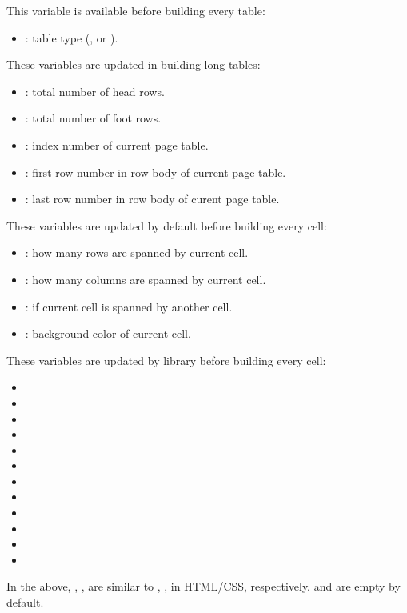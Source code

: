 \documentclass[oneside]{book}
\begin{document}
{This variable is available before building every table:
\begin{itemize}[nosep]
  \item \CC{\lTblrPortraitTypeTl}: table type (,  or ).
\end{itemize}

These variables are updated in building long tables:
\begin{itemize}[nosep]
  \item \CC{\lTblrRowHeadInt}: total number of head rows.
  \item \CC{\lTblrRowFootInt}: total number of foot rows.
  \item \CC{\lTblrTablePageInt}: index number of current page table.
  \item \CC{\lTblrRowFirstInt}: first row number in row body of current page table.
  \item \CC{\lTblrRowLastInt}: last row number in row body of curent page table.
\end{itemize}

These variables are updated by default before building every cell:
\begin{itemize}[nosep]
  \item \CC{\lTblrCellRowSpanInt}: how many rows are spanned by current cell.
  \item \CC{\lTblrCellColSpanInt}: how many columns are spanned by current cell.
  \item \CC{\lTblrCellOmittedBool}: if current cell is spanned by another cell.
  \item \CC{\lTblrCellBackgroundTl}: background color of current cell.
\end{itemize}

These variables are updated by  library before building every cell:
\begin{itemize}[nosep]
  \item \CC{\lTblrCellAboveBorderStyleTl}
  \item \CC{\lTblrCellAboveBorderWidthDim}
  \item \CC{\lTblrCellAboveBorderColorTl}
  \item \CC{\lTblrCellBelowBorderStyleTl}
  \item \CC{\lTblrCellBelowBorderWidthDim}
  \item \CC{\lTblrCellBelowBorderColorTl}
  \item \CC{\lTblrCellLeftBorderStyleTl}
  \item \CC{\lTblrCellLeftBorderWidthDim}
  \item \CC{\lTblrCellLeftBorderColorTl}
  \item \CC{\lTblrCellRightBorderStyleTl}
  \item \CC{\lTblrCellRightBorderWidthDim}
  \item \CC{\lTblrCellRightBorderColorTl}
\end{itemize}
In the above, , ,  are similar to
, ,  in HTML/CSS, respectively.
 and  are empty by default.

}
\end{document}
